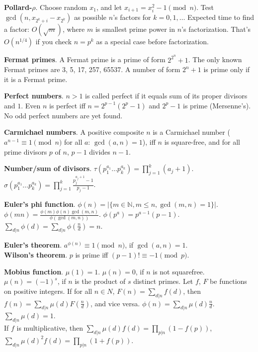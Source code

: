 \documentclass[a4paper, 12pt]{article}
\let\le=\leqslant
\newcommand{\Topic}[1]{\textbf{#1}}
\begin{document}
\Topic{Pollard-$\rho$}.
Choose random $x_1$, and let $x_{i+1} = x_i^2 - 1 \pmod{n}$.
Test $\gcd(n, x_{2^k+i} - x_{2^k})$ as possible $n$'s factors for $k=0,1,\ldots$
Expected time to find a factor: $O(\sqrt{m})$, where $m$ is smallest
prime power in $n$'s factorization.
That's $O(n^{1/4})$ if you check $n = p^k$ as a special case before factorization.

\Topic{Fermat primes}.  A Fermat prime is a prime of form $2^{2^n}+1$.
The only known Fermat primes are 3, 5, 17, 257, 65537.
A number of form $2^n+1$ is prime only if it is a Fermat prime.


\Topic{Perfect numbers}.  $n>1$ is called perfect if it equals
sum of its proper divisors and $1$.  Even $n$ is perfect iff $n = 2^{p-1} (2^p - 1)$
and $2^p - 1$ is prime (Mersenne's). No odd perfect numbers are yet found.

\Topic{Carmichael numbers}.
A positive composite $n$ is a Carmichael number
($a^{n-1} \equiv 1 \pmod{n}$ for all $a$: $\gcd(a,n)=1$),
iff $n$ is square-free, and for all prime divisors $p$ of $n$, $p-1$ divides $n-1$.

\Topic{Number/sum of divisors}.
$\tau(p_1^{a_1} \dots p_k^{a_k}) = \prod_{j=1}^k (a_j+1)$. \quad
$\sigma(p_1^{a_1} \dots p_k^{a_k}) = \prod_{j=1}^k \frac{p_j^{a_j+1}-1}{p_j-1}$.

\Topic{Euler's phi function}.
$\phi(n)=|\{m \in {\mathbb N}, m \le n, \gcd(m, n) = 1 \}|$. \\
$\phi(mn) = \frac{\phi(m) \phi(n) \gcd(m,n)}{\phi(\gcd(m,n))}$. \quad
$\phi(p^a) = p^{a-1} (p-1)$. \quad
$\sum_{d|n} \phi(d) = \sum_{d|n} \phi(\frac{n}{d}) = n$.

\Topic{Euler's theorem}. $a^{\phi(n)} \equiv 1\pmod{n}$, if $\gcd(a,n)=1$. \\
\Topic{Wilson's theorem}. $p$ is prime iff $(p - 1)! \equiv -1 \pmod p$.

\Topic{Mobius function}.
$\mu(1) = 1$. $\mu(n) = 0$, if $n$ is not squarefree.
$\mu(n) = (-1)^s$, if $n$ is the product of $s$ distinct primes.
Let $f$, $F$ be functions on positive integers.
If for all $n \in N$, $F(n)=\sum_{d|n} f(d)$, then $f(n) = \sum_{d|n} \mu(d) F(\frac{n}{d})$,
and vice versa. \quad
$\phi(n) = \sum_{d|n} \mu(d) \frac{n}{d}$.
\quad $\sum_{d|n} \mu(d) = 1$. \\
If $f$ is multiplicative, then $\sum_{d|n} \mu(d) f(d) = \prod_{p|n}(1-f(p))$,
$\sum_{d|n} \mu(d)^2 f(d) = \prod_{p|n} (1+f(p))$.
\end{document}
